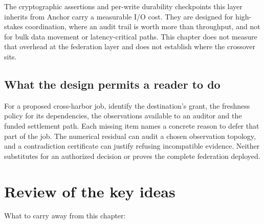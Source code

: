 \documentclass[11pt,a4paper]{article}
\theoremstyle{definition}
\theoremstyle{remark}
\begin{document}
The cryptographic assertions and per-write durability checkpoints this layer inherits from Anchor carry a measurable I/O cost. They are designed for high-stakes coordination, where an audit trail is worth more than throughput, and not for bulk data movement or latency-critical paths. This chapter does not measure that overhead at the federation layer and does not establish where the crossover sits.

\subsection{What the design permits a reader to do}\label{sec:fh-lim-reader}
For a proposed cross-harbor job, identify the destination's grant, the
freshness policy for its dependencies, the observations available to an
auditor and the funded settlement path. Each missing item names a concrete
reason to defer that part of the job. The numerical residual can audit a
chosen observation topology, and a contradiction certificate can justify
refusing incompatible evidence. Neither substitutes for an authorized
decision or proves the complete federation deployed.

\pdexercisepointer{\ref{ex:fh-correlated-equilibrium}}{\ref{ex:fh-synthesis}}{\pageref{ex:fh-correlated-equilibrium}}

\section*{Review of the key ideas}

What to carry away from this chapter:
\end{document}
